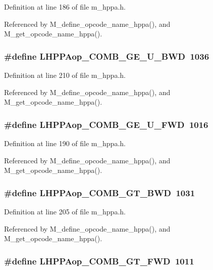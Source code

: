 Definition at line 186 of file m\_\-hppa.h.

Referenced by M\_\-define\_\-opcode\_\-name\_\-hppa(), and M\_\-get\_\-opcode\_\-name\_\-hppa().
\subsubsection{\setlength{\rightskip}{0pt plus 5cm}\#define LHPPAop\_\-COMB\_\-GE\_\-U\_\-BWD~1036}\label{m__hppa_8h_547a384216871a70a9e7c458e7ef01a3}




Definition at line 210 of file m\_\-hppa.h.

Referenced by M\_\-define\_\-opcode\_\-name\_\-hppa(), and M\_\-get\_\-opcode\_\-name\_\-hppa().
\subsubsection{\setlength{\rightskip}{0pt plus 5cm}\#define LHPPAop\_\-COMB\_\-GE\_\-U\_\-FWD~1016}\label{m__hppa_8h_5b9df7cbcbcbedc626c8d88793c4e435}




Definition at line 190 of file m\_\-hppa.h.

Referenced by M\_\-define\_\-opcode\_\-name\_\-hppa(), and M\_\-get\_\-opcode\_\-name\_\-hppa().
\subsubsection{\setlength{\rightskip}{0pt plus 5cm}\#define LHPPAop\_\-COMB\_\-GT\_\-BWD~1031}\label{m__hppa_8h_6322f6f67765f4663f8e00a6e94ab767}




Definition at line 205 of file m\_\-hppa.h.

Referenced by M\_\-define\_\-opcode\_\-name\_\-hppa(), and M\_\-get\_\-opcode\_\-name\_\-hppa().
\subsubsection{\setlength{\rightskip}{0pt plus 5cm}\#define LHPPAop\_\-COMB\_\-GT\_\-FWD~1011}\label{m__hppa_8h_0380efb24e04efed903b51c53cec45ac}




